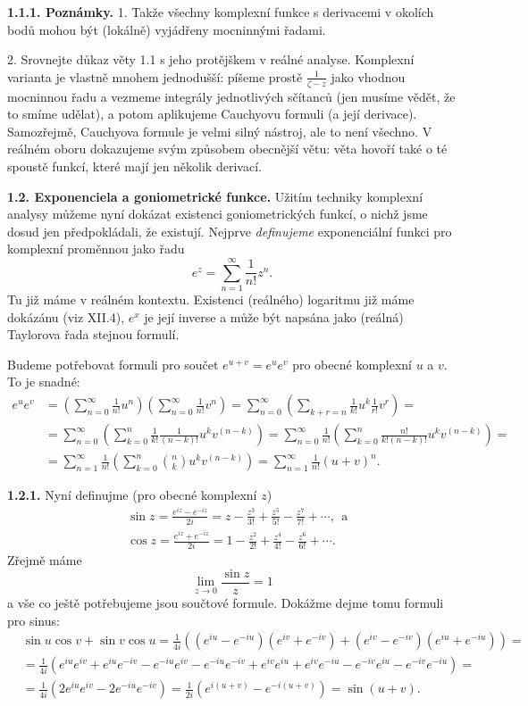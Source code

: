 \documentclass[12pt]{article}
\begin{document}
\medskip

{\bf 1.1.1. Poznámky.}  1. Takže všechny komplexní funkce s derivacemi v okolích bodů mohou být (lokálně) vyjádřeny mocninnými řadami.

2. Srovnejte důkaz věty 1.1 s jeho protějškem v reálné analyse. Komplexní varianta je vlastně mnohem jednodušší: píšeme prostě $\frac1{\zeta-z}$ jako vhodnou mocninnou řadu a vezmeme integrály jednotlivých sčítanců (jen musíme vědět, že to smíme udělat), a potom aplikujeme Cauchyovu formuli (a její derivace). Samozřejmě, Cauchyova formule je velmi silný nástroj,  ale to není všechno. V reálném oboru dokazujeme svým způsobem obecnější větu: věta hovoří také o té spoustě funkcí, které mají jen několik derivací.

\bigskip

{\bf 1.2. Exponenciela a goniometrické funkce.} Užitím techniky komplexní analysy můžeme nyní dokázat existenci goniometrických funkcí, o nichž jsme dosud jen předpokládali, že existují. Nejprve {\em definujeme} exponenciální funkci pro komplexní proměnnou jako řadu
$$
e^z=\sum_{n=1}^\infty\frac1{n!}z^n.
$$
Tu již máme v reálném kontextu. Existenci (reálného) logaritmu již máme dokázánu (viz XII.4),  $e^x$ je její inverse a může být napsána jako (reálná) Taylorova řada stejnou formulí. 

Budeme potřebovat formuli pro součet $e^{u+v}=e^ue^v$ pro obecné komplexní $u$ a $v$. To je snadné:
$$
\begin{aligned}
e^ue^v&=\left(\sum_{n=0}^\infty\frac1{n!}u^n\right)\left(\sum_{n=0}^\infty\frac1{n!}v^n\right)=
\sum_{n=0}^\infty\left(\sum_{k+r=n}\frac1{k!}u^k\frac1{r!}v^r\right)=\\
&=\sum_{n=0}^\infty\left(\sum_{k=0}^n\frac1{k!}\frac1{(n-k)!}u^kv^{(n-k)}\right)=
\sum_{n=0}^\infty\frac1{n!}\left(\sum_{k=0}^n\frac{n!}{k!(n-k)!}u^kv^{(n-k)}\right)=\\
&=\sum_{n=1}^\infty\frac{1}{n!}\left(\sum_{k=0}^n{{n}\choose{k}}u^kv^{(n-k)}\right)=
\sum_{n=1}^\infty\frac1{n!}(u+v)^n.
\end{aligned}
$$

\medskip

{\bf 1.2.1.} Nyní definujme (pro obecné komplexní $z$)
$$
\begin{aligned}
&\sin z= \frac{e^{iz}-e^{-iz}}{2i}=z-\frac{z^3}{3!}+\frac{z^5}{5!}-\frac{z^7}{7!}+\cdots,\ \ \text{a}\\
&\cos z= \frac{e^{iz}+e^{-iz}}{2i}=1-\frac{z^2}{2!}+\frac{z^4}{4!}-\frac{z^6}{6!}+\cdots.
\end{aligned}
$$
Zřejmě máme
$$
\lim_{z\to 0}\frac{\sin z}{z}=1
$$
a vše co ještě potřebujeme jsou součtové formule. Dokážme dejme tomu formuli pro sinus:
$$
\begin{aligned}
&\sin u\cos v+\sin v\cos u=\frac1{4i}((e^{iu}-e^{-iu})(e^{iv}+e^{-iv})+
(e^{iv}-e^{-iv})(e^{iu}+e^{-iu}))=\\
&=\frac1{4i}(e^{iu}e^{iv}+e^{iu}e^{-iv}
-e^{-iu}e^{iv}-e^{-iu}e^{-iv}+e^{iv}e^{iu}+e^{iv}e^{-iu}
-e^{-iv}e^{iu}-e^{-iv}e^{-iu})=\\
&=\frac1{4i}(2e^{iu}e^{iv}
-2e^{-iu}e^{-iv})=\frac1{2i}(e^{i(u+v)}-
e^{-i(u+v)})=\sin(u+v).
\end{aligned}
$$
\end{document}
